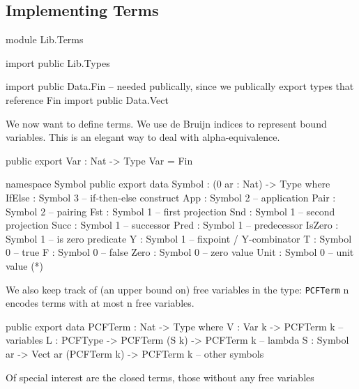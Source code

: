 \subsection{Implementing Terms}

\begin{hidden}
module Lib.Terms

import public Lib.Types

import public Data.Fin  -- needed publically, since we publically export types that reference Fin
import public Data.Vect

\end{hidden}

We now want to define terms. We use de Bruijn indices to represent bound variables.
This is an elegant way to deal with alpha-equivalence.

\begin{code}
public export
Var : Nat -> Type
Var = Fin
\end{code}


\begin{code}
namespace Symbol
  public export
  data Symbol : (0 ar : Nat) -> Type where
    IfElse : Symbol 3       -- if-then-else construct
    App    : Symbol 2       -- application
    Pair   : Symbol 2       -- pairing
    Fst    : Symbol 1       -- first projection
    Snd    : Symbol 1       -- second projection
    Succ   : Symbol 1       -- successor
    Pred   : Symbol 1       -- predecessor
    IsZero : Symbol 1       -- is zero predicate
    Y      : Symbol 1       -- fixpoint / Y-combinator
    T      : Symbol 0       -- true
    F      : Symbol 0       -- false
    Zero   : Symbol 0       -- zero value
    Unit   : Symbol 0       -- unit value (*)
\end{code}

We also keep track of (an upper bound on) free variables in the type:
\lstinline{PCFTerm} n encodes terms with at most n free variables.

\begin{code}
public export
data PCFTerm : Nat -> Type where
  V    : Var k -> PCFTerm k                             -- variables
  L    : PCFType   -> PCFTerm (S k) -> PCFTerm k        -- lambda
  S    : Symbol ar -> Vect ar (PCFTerm k) -> PCFTerm k  -- other symbols
\end{code}

Of special interest are the closed terms, those without any free variables

